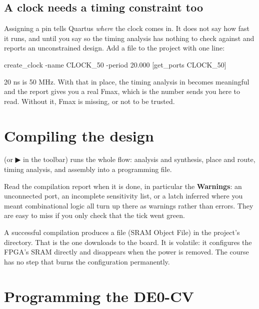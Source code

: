 \subsection{A clock needs a timing constraint too}
\label{app:quartus:sdc}

Assigning  a pin tells Quartus \emph{where} the clock comes in. It does not say how
fast it runs, and until you say so the timing analysis has nothing to check against and reports an
unconstrained design. Add a  file to the project with one line:

\begin{console}
create_clock -name CLOCK_50 -period 20.000 [get_ports CLOCK_50]
\end{console}

20 ns is 50 MHz. With that in place, the timing analysis in 
becomes meaningful and the report gives you a real Fmax, which is the number 
sends you here to read. Without it, Fmax is missing, or not to be trusted.

\section{Compiling the design}
\label{app:quartus:compile}

 (or ▶ in the toolbar) runs the whole flow: analysis and
synthesis, place and route, timing analysis, and assembly into a programming file.

Read the compilation report when it is done, in particular the \textbf{Warnings}: an unconnected port,
an incomplete sensitivity list, or a latch inferred where you meant combinational logic all turn up
there as warnings rather than errors. They are easy to miss if you only check that the tick went
green.

A successful compilation produces a  file (SRAM Object File) in the project's
 directory. That is the one  downloads to the board. It
is volatile: it configures the FPGA's SRAM directly and disappears when the power is removed. The
course has no step that burns the configuration permanently.

\section{Programming the DE0-CV}
\label{app:quartus:program}

